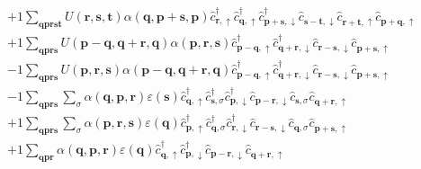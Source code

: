\begin{align}
	&+1 \sum_{ \mathbf{q} \mathbf{p} \mathbf{r} \mathbf{s} \mathbf{t} } U( \mathbf{r}, \mathbf{s}, \mathbf{t} )  \alpha( \mathbf{q}, \mathbf{p}+\mathbf{s}, \mathbf{p} )   \hat{c}_{ \mathbf{r}, \uparrow }^\dagger  \hat{c}_{ \mathbf{q}, \uparrow }^\dagger  \hat{c}_{ \mathbf{p}+\mathbf{s}, \downarrow }^\dagger  \hat{c}_{ \mathbf{s}-\mathbf{t}, \downarrow }^{\phantom{\dagger}} \hat{c}_{ \mathbf{r}+\mathbf{t}, \uparrow }^{\phantom{\dagger}} \hat{c}_{ \mathbf{p}+\mathbf{q}, \uparrow }^{\phantom{\dagger}}  \\
	&+1 \sum_{ \mathbf{q} \mathbf{p} \mathbf{r} \mathbf{s} } U( \mathbf{p}-\mathbf{q}, \mathbf{q}+\mathbf{r}, \mathbf{q} )  \alpha( \mathbf{p}, \mathbf{r}, \mathbf{s} )   \hat{c}_{ \mathbf{p}-\mathbf{q}, \uparrow }^\dagger  \hat{c}_{ \mathbf{q}+\mathbf{r}, \downarrow }^\dagger  \hat{c}_{ \mathbf{r}-\mathbf{s}, \downarrow }^{\phantom{\dagger}} \hat{c}_{ \mathbf{p}+\mathbf{s}, \uparrow }^{\phantom{\dagger}}  \\
	&-1 \sum_{ \mathbf{q} \mathbf{p} \mathbf{r} \mathbf{s} } U( \mathbf{p}, \mathbf{r}, \mathbf{s} )  \alpha( \mathbf{p}-\mathbf{q}, \mathbf{q}+\mathbf{r}, \mathbf{q} )   \hat{c}_{ \mathbf{p}-\mathbf{q}, \uparrow }^\dagger  \hat{c}_{ \mathbf{q}+\mathbf{r}, \downarrow }^\dagger  \hat{c}_{ \mathbf{r}-\mathbf{s}, \downarrow }^{\phantom{\dagger}} \hat{c}_{ \mathbf{p}+\mathbf{s}, \uparrow }^{\phantom{\dagger}}  \\
	&-1 \sum_{ \mathbf{q} \mathbf{p} \mathbf{r} \mathbf{s} } \sum_{ \sigma } \alpha( \mathbf{q}, \mathbf{p}, \mathbf{r} )  \varepsilon( \mathbf{s} )   \hat{c}_{ \mathbf{q}, \uparrow }^\dagger  \hat{c}_{ \mathbf{s}, \sigma }^\dagger  \hat{c}_{ \mathbf{p}, \downarrow }^\dagger  \hat{c}_{ \mathbf{p}-\mathbf{r}, \downarrow }^{\phantom{\dagger}} \hat{c}_{ \mathbf{s}, \sigma }^{\phantom{\dagger}} \hat{c}_{ \mathbf{q}+\mathbf{r}, \uparrow }^{\phantom{\dagger}}  \\
	&+1 \sum_{ \mathbf{q} \mathbf{p} \mathbf{r} \mathbf{s} } \sum_{ \sigma } \alpha( \mathbf{p}, \mathbf{r}, \mathbf{s} )  \varepsilon( \mathbf{q} )   \hat{c}_{ \mathbf{p}, \uparrow }^\dagger  \hat{c}_{ \mathbf{q}, \sigma }^\dagger  \hat{c}_{ \mathbf{r}, \downarrow }^\dagger  \hat{c}_{ \mathbf{r}-\mathbf{s}, \downarrow }^{\phantom{\dagger}} \hat{c}_{ \mathbf{q}, \sigma }^{\phantom{\dagger}} \hat{c}_{ \mathbf{p}+\mathbf{s}, \uparrow }^{\phantom{\dagger}}  \\
	&+1 \sum_{ \mathbf{q} \mathbf{p} \mathbf{r} } \alpha( \mathbf{q}, \mathbf{p}, \mathbf{r} )  \varepsilon( \mathbf{q} )   \hat{c}_{ \mathbf{q}, \uparrow }^\dagger  \hat{c}_{ \mathbf{p}, \downarrow }^\dagger  \hat{c}_{ \mathbf{p}-\mathbf{r}, \downarrow }^{\phantom{\dagger}} \hat{c}_{ \mathbf{q}+\mathbf{r}, \uparrow }^{\phantom{\dagger}}  \\

\end{align}
